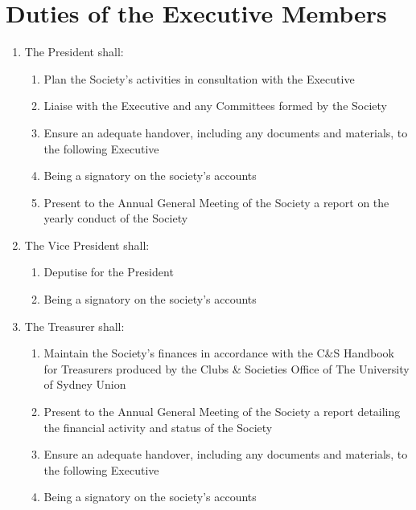 \documentclass[11pt]{article}
\begin{document}
\section{Duties of the Executive Members}
\begin{enumerate}[\thesection .1]
    \item The President shall:
    \begin{enumerate}
        \item Plan the Society’s activities in consultation with the Executive
        \item Liaise with the Executive and any Committees formed by the    Society	
        \item Ensure an adequate handover, including any documents and materials, to the following Executive
        \item Being a signatory on the society’s accounts
        \item Present to the Annual General Meeting of the Society a report on the yearly conduct of the Society
    \end{enumerate}
    \item The Vice President shall:
    \begin{enumerate}
        \item Deputise for the President
        \item Being a signatory on the society’s accounts
    \end{enumerate}
    \item The Treasurer shall:
    \begin{enumerate}[\hspace{5mm}5.4.1]
        \item Maintain the Society’s finances in accordance with the C\&S Handbook for Treasurers produced by the Clubs \& Societies Office of The University of Sydney Union
        \item Present to the Annual General Meeting of the Society a report detailing the financial activity and status of the Society
        \item Ensure an adequate handover, including any documents and materials, to the following Executive
        \item Being a signatory on the society’s accounts

\end{enumerate}
\end{enumerate}
\end{document}
